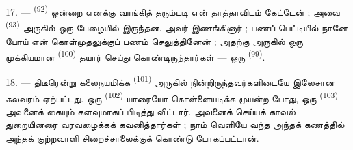 \VUsaut{4.4mm}
\VUsaut{2.8mm}

17. ---  \textsuperscript{(92)} ஒன்றை
எனக்கு வாங்கித் தரும்படி என் தாத்தாவிடம் கேட்டேன் ; அவை
 \textsuperscript{(93)} அருகில் ஒரு
பேழையில் இருந்தன. அவர் இணங்கினார் ; பணப் பெட்டியில் நானே போய்
என் கொள்முதலுக்குப் பணம் செலுத்தினேன் ; அதற்கு அருகில் ஒரு
முக்கியமான  \textsuperscript{(100)}
தயார் செய்து கொண்டிருந்தார்கள் — ஒரு 
\textsuperscript{(99)}.

18. --- திடீரென்று கலைநயமிக்க 
\textsuperscript{(101)} அருகில் நின்றிருந்தவர்களிடையே இலேசான
கலவரம் ஏற்பட்டது. ஒரு  \textsuperscript{(102)}
யாரையோ கொள்ளையடிக்க முயன்ற போது, ஒரு 
\textsuperscript{(103)} அவனைக் கையும் களவுமாகப் பிடித்து விட்டார்.
அவனைக்  செய்யக் காவல் துறையினரை வரவழைக்கக்
கவனித்தார்கள் ; நாம் வெளியே வந்த அந்தக் கணத்தில் அந்தக்
குற்றவாளி சிறைச்சாலைக்குக் கொண்டு போகப்பட்டான்.

\VUsaut{6.0mm}
\VUfilet{22mm}
